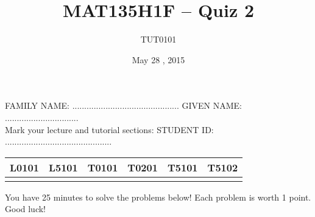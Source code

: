 \documentclass[10pt]{article}
\title{MAT135H1F -- Quiz 2}
\author{TUT0101}
\date{May 28 , 2015}
\begin{document}
\maketitle

FAMILY NAME: ............................................. \hspace{1 cm} GIVEN NAME: ............................... \\



Mark your lecture and tutorial sections: \hspace{1 cm}  STUDENT ID: ............................................. 
\begin{center}


\begin{tabular}{*{6}{|c}|} \hline
L0101 & L5101 & T0101 & T0201 & T5101 & T5102 \\ \hline
& & & & & \\  \hline
\end{tabular}
\end{center}

You have 25 minutes to solve the problems below! Each problem is worth 1 point. Good luck!

\begin{comment}
You have 10 minutes to record your solutions in the boxes below! 

\begin{center}
\begin{tabular}{*{5}{|c}|} \hline
 Question 1. &  Question 2. & Question 3. &  Question 4. & Question 5.  \\ \hline
&&&& \\ \hline
\end{tabular}
\end{center}
\end{comment}


\vspace{0.5 cm}
\end{document}
